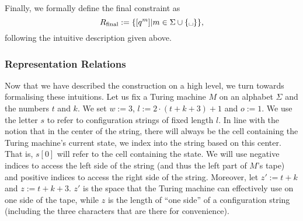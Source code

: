 \documentclass[a4paper,UKenglish,cleveref, autoref]{lipics-v2019}
\newcommand{\Rfinal}{R_{\text{final}}}
\begin{document}
Finally, we formally define the final constraint as 
\[\Rfinal := \{[q^m] | m \in \Sigma \cup \{\blank\}\}, \]
following the intuitive description given above.

\subsubsection{Representation Relations}
Now that we have described the construction on a high level, we turn towards formalising these intuitions. 
Let us fix a Turing machine $M$ on an alphabet $\Sigma$  and the numbers $t$ and $k$. We set $w := 3$, $l := 2\cdot (t + k + 3) + 1$ and $o := 1$. 
We use the letter $s$ to refer to configuration strings of fixed length $l$. 
In line with the notion that in the center of the string, there will always be the cell containing the Turing machine's current state, we index into the string based on this center. 
That is, $s[0]$ will refer to the cell containing the state. 
We will use negative indices to access the left side of the string (and thus the left part of $M$'s tape) and positive indices to access the right side of the string.
Moreover, let $z' := t + k$ and $z := t + k + 3$. $z'$ is the space that the Turing machine can effectively use on one side of the tape, while $z$ is the length of ``one side'' of a configuration string (including the three characters that are there for convenience). 
 
\begin{center}
\end{center}
\end{document}
